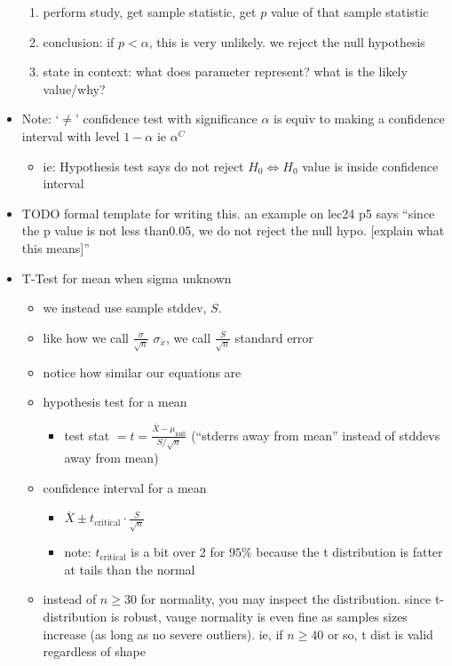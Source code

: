 \documentclass[11pt]{article}
\begin{document}
\begin{itemize}
\begin{enumerate}
    \item perform study, get sample statistic, get $p$ value of that sample statistic
    \item conclusion: if $p < \alpha$, this is very unlikely. we reject the null hypothesis
    \item state in context: what does parameter represent? what is the likely value/why?
  \end{enumerate}
  \item Note: `$\ne$' confidence test with significance $\alpha$ is equiv to making a confidence interval with level $1-\alpha$ ie $\alpha^C$
  \begin{itemize}
    \item ie: Hypothesis test says do not reject $H_0 \Leftrightarrow H_0$ value is inside confidence interval
  \end{itemize}
  \item TODO formal template for writing this. an example on lec24 p5 says ``since the p value is not less than0.05, we do not reject the null hypo. [explain what this means]''
  \newpage
  \item T-Test for mean when sigma unknown
  \begin{itemize}
    \item we instead use sample stddev, $S$.
    \item like how we call $\frac{\sigma}{\sqrt{n}}$ $\sigma_{\overline{x}}$, we call $\frac{S}{\sqrt{n}}$ standard error
    \item notice how similar our equations are
    \item hypothesis test for a mean
    \begin{itemize}
      \item test stat $= t = \frac{\overline{X}-\mu_{\text{null}}}{S / \sqrt{n}}$ (``stderrs away from mean'' instead of stddevs away from mean)
    \end{itemize}
    \item confidence interval for a mean
    \begin{itemize}
      \item $\overline{X} \pm t_{\text{critical}}\cdot \frac{S}{\sqrt{n}}$
      \item note: $t_{\text{critical}}$ is a bit over 2 for $95\%$ because the t distribution is fatter at tails than the normal
    \end{itemize}
    \item instead of $n\ge 30$ for normality, you may inspect the distribution. since t-distribution is robust, vauge normality is even fine as samples sizes increase (as long as no severe outliers). ie, if $n\ge 40$ or so, t dist is valid regardless of shape

\end{itemize}
\end{itemize}
\end{document}
